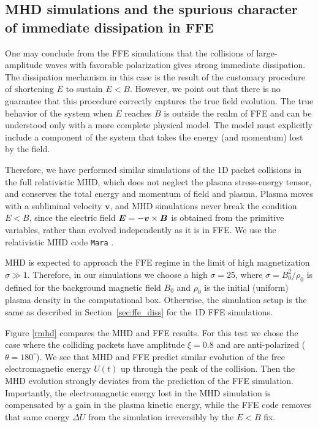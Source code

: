 \subsection{MHD simulations and the spurious character of immediate dissipation in FFE}
%
One may conclude from the FFE simulations that the collisions of large-amplitude \alfven waves with favorable polarization 
gives strong immediate dissipation. The dissipation mechanism in this case is the result of the customary procedure of shortening $E$ to sustain $E<B$. 
However, we point out that there is no guarantee that this procedure correctly captures the true field evolution. 
The true behavior of the system when $E$ reaches $B$ is outside the realm of FFE and can be understood only with a more complete physical model. The model must explicitly include a component of the system that takes the energy (and momentum) lost by the field.

Therefore, we have performed similar simulations of the 1D packet collisions in the full relativistic MHD, which does not neglect the plasma stress-energy tensor, and conserves the total energy and momentum of field and plasma. Plasma moves with a subliminal velocity $\boldsymbol{v}$, and MHD simulations never break the condition $E<B$, since the electric field $\boldsymbol{E} = -\boldsymbol{v} \times \boldsymbol{B}$ is obtained from the primitive variables, rather than evolved independently as it is in FFE. We use the relativistic MHD code \texttt{Mara} \citep{2012ApJ...744...32Z}.

MHD is expected to approach the FFE regime in the limit of high magnetization $\sigma\gg 1$. Therefore, in our simulations we choose a high $\sigma=25$, where $\sigma=B_0^2/\rho_0$ is defined for the background magnetic field $B_0$ and $\rho_0$ is the initial (uniform) plasma density in the computational box. 
Otherwise, the simulation setup is the same as described in Section~\ref{sec:ffe_diss} for the 1D FFE simulations.

Figure \ref{rmhd} compares the MHD and FFE results. For this test we chose the case where the colliding packets have amplitude $\xi=0.8$ and are anti-polarized ($\theta=180^\circ$).
We see that MHD and FFE predict similar evolution of the free electromagnetic energy $U(t)$ up through the peak of the collision. 
Then the MHD evolution strongly deviates from the prediction of the FFE simulation.
Importantly, the electromagnetic energy lost in the MHD simulation is compensated by a gain in the plasma kinetic energy, while the FFE code removes that same energy $\Delta U$ from the simulation irreversibly by the $E < B$ fix. 

